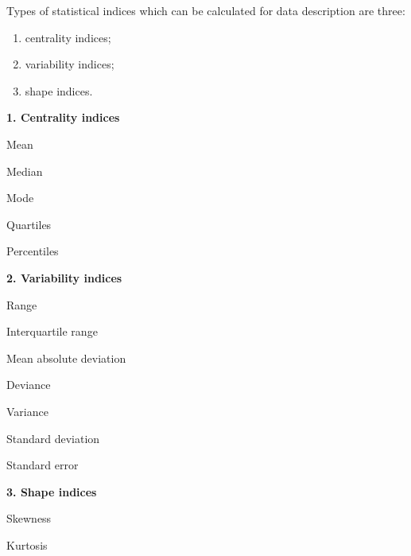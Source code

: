 \begin{frame}
  \vspace*{.29cm}
  Types of statistical indices which can be calculated for data description are three:\\
  \begin{enumerate}
    \item centrality indices;
    \item variability indices;
    \item shape indices.
  \end{enumerate}
  \vspace{0.75cm}
  \textbf{1. Centrality indices}
  \begin{itemize}
    \begin{small}
      \item Mean
      \item Median
      \item Mode
      \item Quartiles
      \item Percentiles
   \end{small}
 \end{itemize}
\end{frame}

\begin{frame}
  \vspace*{.29cm}
  \textbf{2. Variability indices}
  \begin{itemize}
    \begin{small}
      \item Range
      \item Interquartile range
      \item Mean absolute deviation
      \item Deviance
      \item Variance
      \item Standard deviation
      \item Standard error
    \end{small}
  \end{itemize}
  \vspace*{.5cm}
  \textbf{3. Shape indices}
  \begin{itemize}
    \begin{small}
      \item Skewness
      \item Kurtosis
    \end{small}
  \end{itemize}
\end{frame}



